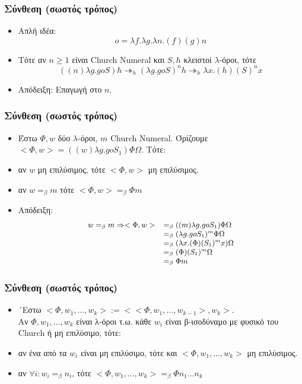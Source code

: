 \documentclass{beamer}
\begin{document}
\begin{frame}
        \frametitle{Σύνθεση (σωστός τρόπος)}
        \begin{itemize}
                \item Απλή ιδέα: $$o = \lambda f. \lambda g. \lambda n . (f) (g) n$$
                \pause
                \item Τότε αν $n \geqslant 1$ είναι Church Numeral και $S, h$ κλειστοί $\lambda$-όροι, τότε
                $$ ((n) \lambda g . g o S) h \twoheadrightarrow _h (\lambda g . g o S)^n h
                   \twoheadrightarrow _h \lambda x . (h) (S)^n x $$ \pause
                 \item Απόδειξη: Επαγωγή στο $n$.
        \end{itemize}
\end{frame}
\begin{frame}
        \frametitle{Σύνθεση (σωστός τρόπος)}
        \begin{itemize}
                \item Έστω $\Phi, w$ δύο $\lambda$-όροι, $m$ Church Numeral. Όρίζουμε $<\Phi, w> = ((w) \lambda g . g o S_1) \Phi \Omega$. Τότε:
                \pause
                \item αν $w$ μη επιλύσιμος, τότε $<\Phi, w>$ μη επιλύσιμος. \pause
                \item αν $w =_\beta m$ τότε $<\Phi, w> =_\beta \Phi m$ \pause
                \item Απόδειξη: 
                $$
                \small
                \begin{array}{ll}
                w =_\beta m \Rightarrow <\Phi, w>
                & =_\beta ((m) \lambda g . g o S_1) \Phi \Omega \\
                & =_\beta (\lambda g . g o S_1)^m \Phi \Omega \\
                & =_\beta (\lambda x . (\Phi) (S_1)^m x) \Omega \\
                & =_\beta (\Phi) (S_1)^m \Omega \\
                & =_\beta \Phi m
                \end{array}
                $$           	
           
        \end{itemize}
\end{frame}

\begin{frame}
        \frametitle{Σύνθεση (σωστός τρόπος)}
        \begin{itemize}
                \item ´Εστω $<\Phi, w_1,\ldots, w_k> := <<\Phi, w_1,\ldots, w_{k-1}>, w_k>$. \\
                  Αν $\Phi, w_1,\ldots, w_k$ είναι λ-όροι τ.ω. κάθε $w_i$ είναι β-ισοδύναμο με φυσικό του Church ή μη επιλύσιμο, τότε: \pause
                 \item αν ένα από τα $w_i$ είναι μη επιλύσιμο, τότε και $<\Phi, w_1,\ldots, w_k>$ μη επιλύσιμος. \pause
                 \item αν $\forall i: w_i =_\beta n_i$, τότε $<\Phi, w_1,\ldots, w_k> =_\beta \Phi n_1 \ldots n_k$   
        \end{itemize}
\end{frame}
\end{document}
